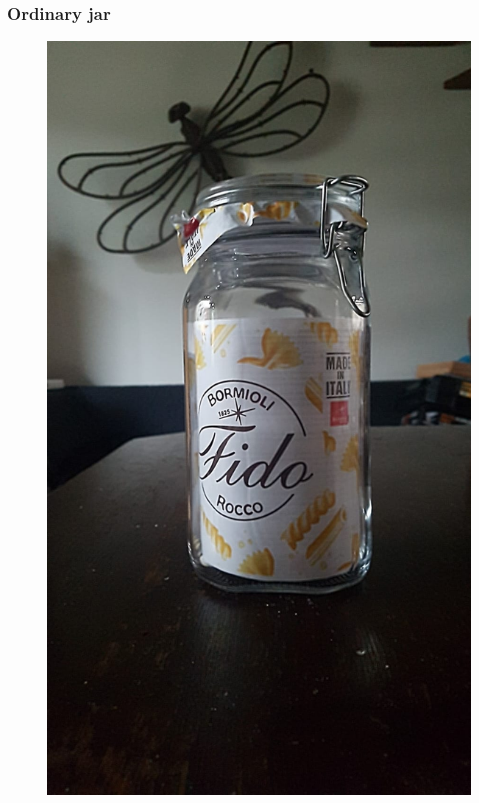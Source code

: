 \documentclass{beamer}
\begin{document}
\begin{frame}
\frametitle{Ordinary jar}
\begin{figure}
\includegraphics[height=.7\textheight]{images/ordinary-jar.jpeg}
\end{figure}
\end{frame}
\end{document}
